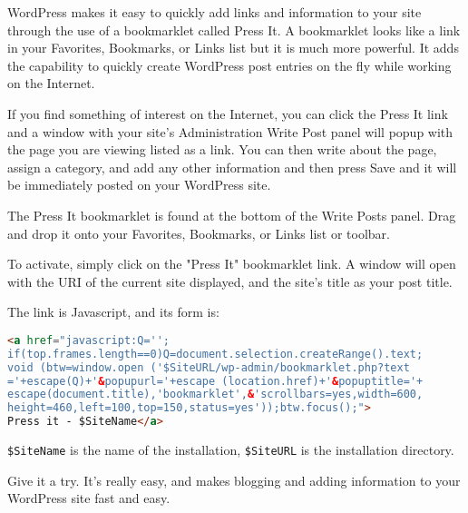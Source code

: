 WordPress makes it easy to quickly add links and information to your site through the use of a bookmarklet called Press It. A bookmarklet looks like a link in your Favorites, Bookmarks, or Links list but it is much more powerful. It adds the capability to quickly create WordPress post entries on the fly while working on the Internet.

If you find something of interest on the Internet, you can click the Press It link and a window with your site's Administration Write Post panel will popup with the page you are viewing listed as a link. You can then write about the page, assign a category, and add any other information and then press Save and it will be immediately posted on your WordPress site.

The Press It bookmarklet is found at the bottom of the Write Posts panel. Drag and drop it onto your Favorites, Bookmarks, or Links list or toolbar.

To activate, simply click on the "Press It" bookmarklet link. A window will open with the URI of the current site displayed, and the site's title as your post title.

The link is Javascript, and its form is:

\begin{lstlisting}[language=HTML]
<a href="javascript:Q='';
if(top.frames.length==0)Q=document.selection.createRange().text;
void (btw=window.open ('$SiteURL/wp-admin/bookmarklet.php?text
='+escape(Q)+'&popupurl='+escape (location.href)+'&popuptitle='+
escape(document.title),'bookmarklet',&'scrollbars=yes,width=600,
height=460,left=100,top=150,status=yes'));btw.focus();">
Press it - $SiteName</a>
\end{lstlisting}

\verb|$SiteName| is the name of the installation, \verb|$SiteURL| is the installation directory.

Give it a try. It's really easy, and makes blogging and adding information to your WordPress site fast and easy.








\clearpage















